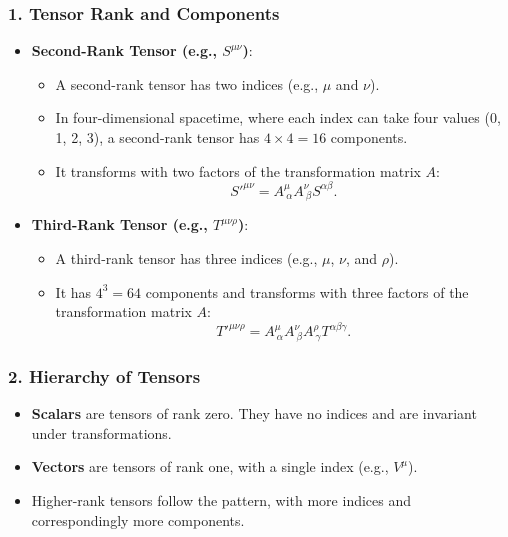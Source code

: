 \documentclass[12pt]{book}
\begin{document}
            \subsubsection{1. Tensor Rank and Components}
                \begin{itemize}
                    \item \textbf{Second-Rank Tensor (e.g., \( S^{\mu \nu} \))}:
                    \begin{itemize}
                        \item A second-rank tensor has two indices (e.g., \( \mu \) and \( \nu \)).
                        \item In four-dimensional spacetime, where each index can take four values (0, 1, 2, 3), a second-rank tensor has \( 4 \times 4 = 16 \) components.
                        \item It transforms with two factors of the transformation matrix \( A \):
                        \[
                        S'^{\mu \nu} = A^\mu_{\ \alpha} A^\nu_{\ \beta} S^{\alpha \beta}.
                        \]
                        \end{itemize}
                
                    \item \textbf{Third-Rank Tensor (e.g., \( T^{\mu \nu \rho} \))}:
                    \begin{itemize}
                        \item A third-rank tensor has three indices (e.g., \( \mu \), \( \nu \), and \( \rho \)).
                        \item It has \( 4^3 = 64 \) components and transforms with three factors of the transformation matrix \( A \):
                        \[
                        T'^{\mu \nu \rho} = A^\mu_{\ \alpha} A^\nu_{\ \beta} A^\rho_{\ \gamma} T^{\alpha \beta \gamma}.
                        \]
                    \end{itemize}
                \end{itemize}
            
            \subsubsection{2. Hierarchy of Tensors}
            
                \begin{itemize}
                    \item \textbf{Scalars} are tensors of rank zero. They have no indices and are invariant under transformations.
                    \item \textbf{Vectors} are tensors of rank one, with a single index (e.g., \( V^\mu \)).
                    \item Higher-rank tensors follow the pattern, with more indices and correspondingly more components.
                \end{itemize}
            
\end{document}
